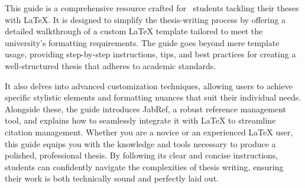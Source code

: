 This guide is a comprehensive resource crafted for \University\ students tackling their theses with LaTeX. 
It is designed to simplify the thesis-writing process by offering a detailed walkthrough of a custom LaTeX template tailored to meet the university's formatting requirements. 
The guide goes beyond mere template usage, providing step-by-step instructions, tips, and best practices for creating a well-structured thesis that adheres to academic standards.

It also delves into advanced customization techniques, allowing users to achieve specific stylistic elements and formatting nuances that suit their individual needs. 
Alongside these, the guide introduces JabRef, a robust reference management tool, and explains how to seamlessly integrate it with LaTeX to streamline citation management. 
Whether you are a novice or an experienced LaTeX user, this guide equips you with the knowledge and tools necessary to produce a polished, professional thesis. 
By following its clear and concise instructions, students can confidently navigate the complexities of thesis writing, ensuring their work is both technically sound and perfectly laid out.